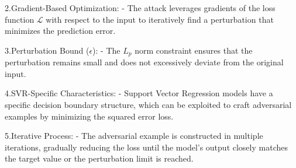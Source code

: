 2.Gradient-Based Optimization:
   - The attack leverages gradients of the loss function $\mathcal{L}$ with respect to the input to iteratively find a perturbation that minimizes the prediction error.

3.Perturbation Bound ($\epsilon$):
   - The $L_p$ norm constraint ensures that the perturbation remains small and does not excessively deviate from the original input.

4.SVR-Specific Characteristics:
   - Support Vector Regression models have a specific decision boundary structure, which can be exploited to craft adversarial examples by minimizing the squared error loss.

5.Iterative Process:
   - The adversarial example is constructed in multiple iterations, gradually reducing the loss until the model's output closely matches the target value or the perturbation limit is reached.